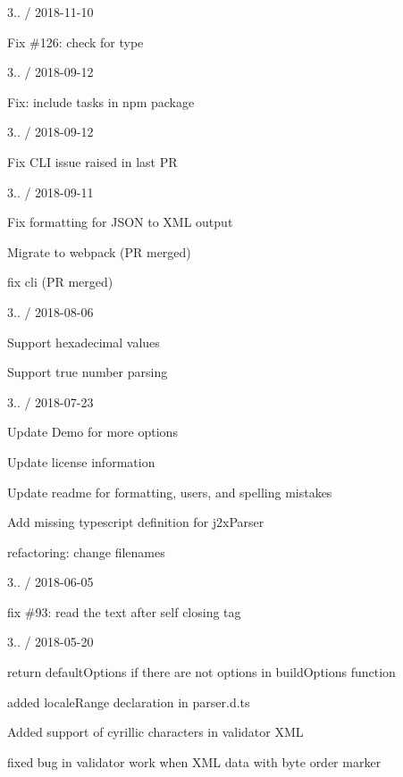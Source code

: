 3.. / 2018-\/11-\/10
\begin{DoxyItemize}
\item Fix \#126\+: check for type
\end{DoxyItemize}

3.. / 2018-\/09-\/12
\begin{DoxyItemize}
\item Fix\+: include tasks in npm package
\end{DoxyItemize}

3.. / 2018-\/09-\/12
\begin{DoxyItemize}
\item Fix CLI issue raised in last PR
\end{DoxyItemize}

3.. / 2018-\/09-\/11
\begin{DoxyItemize}
\item Fix formatting for JSON to XML output
\item Migrate to webpack (PR merged)
\item fix cli (PR merged)
\end{DoxyItemize}

3.. / 2018-\/08-\/06
\begin{DoxyItemize}
\item Support hexadecimal values
\item Support true number parsing
\end{DoxyItemize}

3.. / 2018-\/07-\/23
\begin{DoxyItemize}
\item Update Demo for more options
\item Update license information
\item Update readme for formatting, users, and spelling mistakes
\item Add missing typescript definition for j2x\+Parser
\item refactoring\+: change filenames
\end{DoxyItemize}

3.. / 2018-\/06-\/05
\begin{DoxyItemize}
\item fix \#93\+: read the text after self closing tag
\end{DoxyItemize}

3.. / 2018-\/05-\/20
\begin{DoxyItemize}
\item return default\+Options if there are not options in build\+Options function
\item added locale\+Range declaration in parser.\+d.\+ts
\item Added support of cyrillic characters in validator XML
\item fixed bug in validator work when XML data with byte order marker
\end{DoxyItemize}

